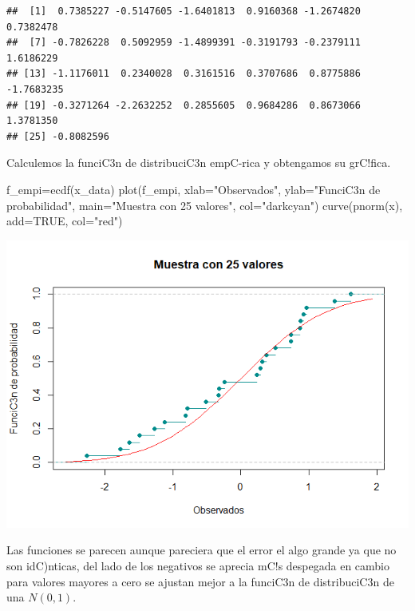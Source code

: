 \documentclass[
]{article}
\newenvironment{Shaded}{\begin{snugshade}}{\end{snugshade}}
\newcommand{\AttributeTok}[1]{\textcolor[rgb]{0.77,0.63,0.00}{#1}}
\newcommand{\ConstantTok}[1]{\textcolor[rgb]{0.00,0.00,0.00}{#1}}
\newcommand{\FunctionTok}[1]{\textcolor[rgb]{0.00,0.00,0.00}{#1}}
\newcommand{\NormalTok}[1]{#1}
\newcommand{\OtherTok}[1]{\textcolor[rgb]{0.56,0.35,0.01}{#1}}
\newcommand{\StringTok}[1]{\textcolor[rgb]{0.31,0.60,0.02}{#1}}
\begin{document}
\begin{verbatim}
##  [1]  0.7385227 -0.5147605 -1.6401813  0.9160368 -1.2674820  0.7382478
##  [7] -0.7826228  0.5092959 -1.4899391 -0.3191793 -0.2379111  1.6186229
## [13] -1.1176011  0.2340028  0.3161516  0.3707686  0.8775886 -1.7683235
## [19] -0.3271264 -2.2632252  0.2855605  0.9684286  0.8673066  1.3781350
## [25] -0.8082596
\end{verbatim}

Calculemos la funciC3n de distribuciC3n empC-rica y obtengamos su
grC!fica.

\begin{Shaded}
\begin{Highlighting}[]
\NormalTok{f\_empi}\OtherTok{=}\FunctionTok{ecdf}\NormalTok{(x\_data)}
\FunctionTok{plot}\NormalTok{(f\_empi, }\AttributeTok{xlab=}\StringTok{"Observados"}\NormalTok{, }\AttributeTok{ylab=}\StringTok{"FunciC3n de probabilidad"}\NormalTok{, }
     \AttributeTok{main=}\StringTok{"Muestra con 25 valores"}\NormalTok{, }\AttributeTok{col=}\StringTok{"darkcyan"}\NormalTok{)}
\FunctionTok{curve}\NormalTok{(}\FunctionTok{pnorm}\NormalTok{(x), }\AttributeTok{add=}\ConstantTok{TRUE}\NormalTok{, }\AttributeTok{col=}\StringTok{"red"}\NormalTok{)}
\end{Highlighting}
\end{Shaded}

\includegraphics{Pruebas_p_files/figure-html/unnamed-chunk-52-1.png}

Las funciones se parecen aunque pareciera que el error el algo grande ya
que no son idC)nticas, del lado de los negativos se aprecia mC!s
despegada en cambio para valores mayores a cero se ajustan mejor a la
funciC3n de distribuciC3n de una \(N(0,1)\).
\end{document}
